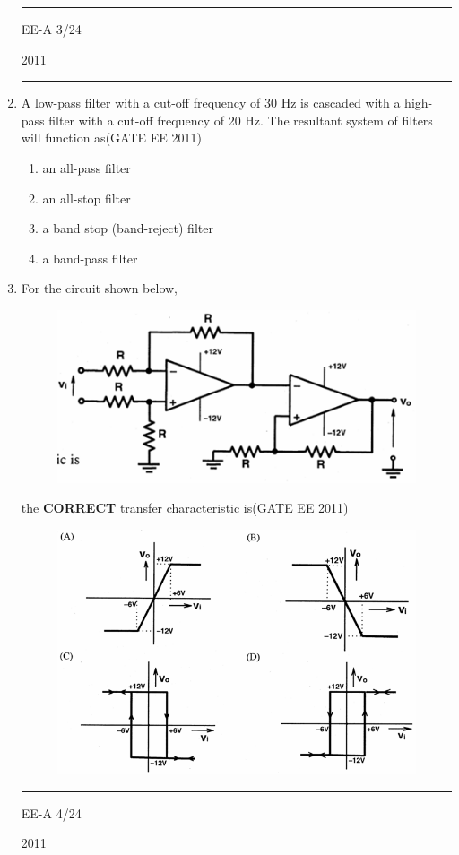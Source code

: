 \documentclass[a4paper,10pt]{exam}
\theoremstyle{remark}
\begin{document}
\begin{enumerate}
\vspace{1cm}
\noindent\rule{\textwidth}{0.4pt}
\raggedright{EE-A}
\hfill
3/24
\newpage
\raggedright{2011}
\hfill
{}\\

\noindent\rule{\textwidth}{0.4pt}

\item  A low-pass filter with a cut-off frequency of 30 Hz is cascaded with a high-pass filter with a cut-off frequency of 20 Hz. The resultant system of filters will function as\hfill{(GATE EE 2011)}
\begin{multicols}{2}
\begin{enumerate}
     \item an all-pass filter 
 \item an all-stop filter
 \item  a band stop (band-reject) filter 
 \item a band-pass filter
\end{enumerate}
\end{multicols}

\item For the circuit shown below,
\begin{figure}[H]
    \centering
    \includegraphics[width=0.7\columnwidth]{figs/Q 12.png}\caption{}     \label{fig:myfigure}
\end{figure}

the \textbf{CORRECT} transfer characteristic is\hfill{(GATE EE 2011)}

\begin{figure}[H]
    \centering
    \includegraphics[width=0.9\columnwidth]{figs/Q 12 opt.png}
\end{figure}
\vspace{1cm}
\noindent\rule{\textwidth}{0.4pt}
\raggedright{EE-A}
\hfill
4/24
\newpage
\raggedright{2011}
\hfill
{}\\


\end{enumerate}
\end{document}

